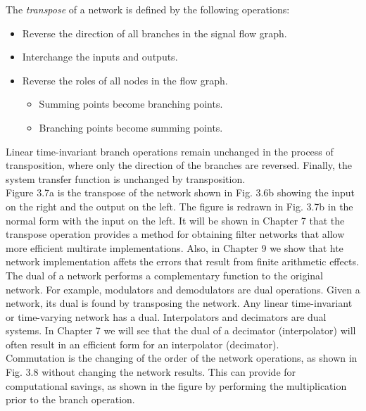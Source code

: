 \documentclass[11pt]{report}
\theoremstyle{example}
\begin{document}
The \emph{transpose} of a network is defined by the following operations:
\begin{itemize}
	\item Reverse the direction of all branches in the signal flow graph.
	\item Interchange the inputs and outputs.
	\item Reverse the roles of all nodes in the flow graph.
		\begin{itemize}
			\item Summing points become branching points.
			\item Branching points become summing points.
		\end{itemize}
\end{itemize}
Linear time-invariant branch operations remain unchanged in the process of transposition, where only the direction of the branches are reversed. Finally, the system transfer function is unchanged by transposition.\\
Figure 3.7a is the transpose of the network shown in Fig. 3.6b showing the input on the right and the output on the left. The figure is redrawn in Fig. 3.7b in the normal form with the input on the left. It will be shown in Chapter 7 that the transpose operation provides a method for obtaining filter networks that allow more efficient multirate implementations. Also, in Chapter 9 we show that hte network implementation affets the errors that result from finite arithmetic effects.\\
The dual of a network performs a complementary function to the original network. For example, modulators and demodulators are dual operations. Given a network, its dual is found by transposing the network. Any linear time-invariant or time-varying network has a dual. Interpolators and decimators are dual systems. In Chapter 7 we will see that the dual of a decimator (interpolator) will often result in an efficient form for an interpolator (decimator).\\
Commutation is the changing of the order of the network operations, as shown in Fig. 3.8 without changing the network results. This can provide for computational savings, as shown in the figure by performing the multiplication prior to the branch operation.
\end{document}
